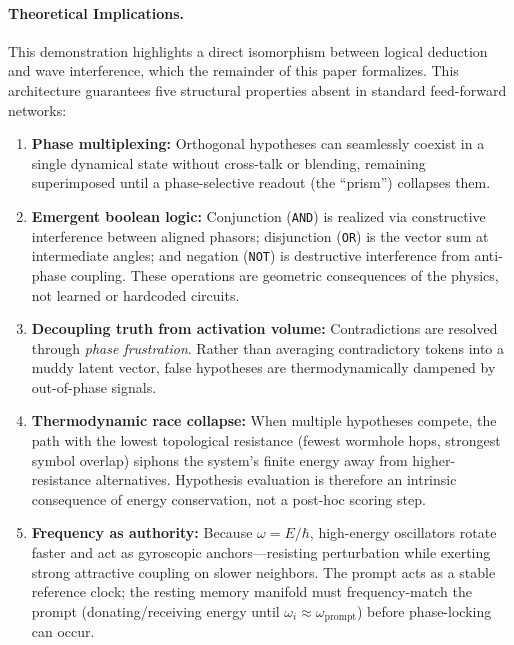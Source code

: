 \documentclass[11pt,a4paper]{article}
\begin{document}


\paragraph{Theoretical Implications.}
This demonstration highlights a direct isomorphism between logical deduction and wave interference, which the remainder of this paper formalizes. This architecture guarantees five structural properties absent in standard feed-forward networks:

\begin{enumerate}[nosep]
  \item \textbf{Phase multiplexing:} Orthogonal hypotheses can seamlessly coexist in a single dynamical state without cross-talk or blending, remaining superimposed until a phase-selective readout (the ``prism'') collapses them.
  \item \textbf{Emergent boolean logic:} Conjunction (\texttt{AND}) is realized via constructive interference between aligned phasors; disjunction (\texttt{OR}) is the vector sum at intermediate angles; and negation (\texttt{NOT}) is destructive interference from anti-phase coupling. These operations are geometric consequences of the physics, not learned or hardcoded circuits.
  \item \textbf{Decoupling truth from activation volume:} Contradictions are resolved through \emph{phase frustration}. Rather than averaging contradictory tokens into a muddy latent vector, false hypotheses are thermodynamically dampened by out-of-phase signals. 
  \item \textbf{Thermodynamic race collapse:} When multiple hypotheses compete, the path with the lowest topological resistance (fewest wormhole hops, strongest symbol overlap) siphons the system's finite energy away from higher-resistance alternatives. Hypothesis evaluation is therefore an intrinsic consequence of energy conservation, not a post-hoc scoring step.
  \item \textbf{Frequency as authority:} Because $\omega = E/\hbar$, high-energy oscillators rotate faster and act as gyroscopic anchors---resisting perturbation while exerting strong attractive coupling on slower neighbors. The prompt acts as a stable reference clock; the resting memory manifold must frequency-match the prompt (donating/receiving energy until $\omega_i \approx \omega_{\text{prompt}}$) before phase-locking can occur. 
\end{enumerate}
\end{document}
